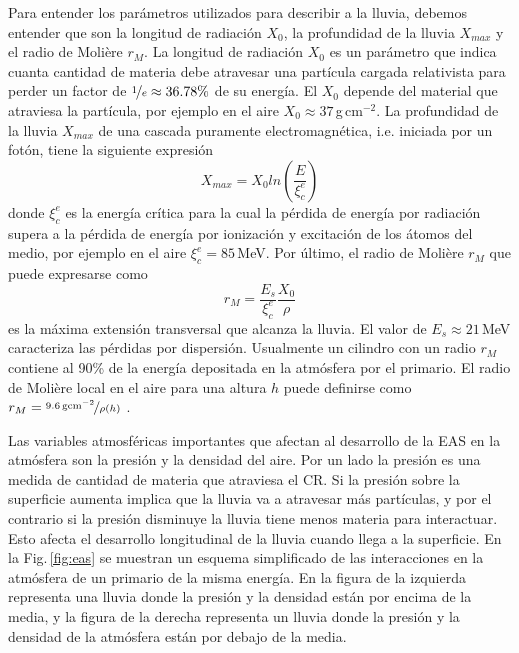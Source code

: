 
Para entender los parámetros utilizados para describir a la lluvia, debemos entender que son la longitud de radiación $X_0$, la profundidad de la lluvia $X_{max}$ y el radio de Molière $r_M$. La longitud de radiación  $X_0$ es un parámetro que indica cuanta cantidad de materia debe atravesar una partícula cargada relativista para perder un factor de $\nicefrac{1}{e}\approx 36.78\%$ de su  energía. El $X_0$ depende del material que atraviesa la partícula, por ejemplo en el aire $X_0\approx 37\,$g\,cm$^{-2}$. La profundidad de la lluvia $X_{max}$ de una cascada puramente electromagnética, i.e. iniciada por un fotón, tiene la siguiente expresión \cite{matthews2005heitler}
\begin{equation}
 	X_{max} = X_0{ln(\frac{E}{\xi^e_c})}
 \end{equation} 
donde  $\xi^e_c$ es la energía crítica para la cual la pérdida de energía por radiación supera a la pérdida de energía por ionización y excitación de los átomos del medio, por ejemplo en el aire $\xi^e_c=85\,$MeV. Por último, el radio de Molière $r_M$ que puede expresarse como 
\begin{equation}
	r_M= \frac{E_s}{\xi^e_c}\frac{X_0}{\rho}
\end{equation}
es la máxima extensión transversal que alcanza la lluvia. El valor de $E_s\approx21\,$MeV caracteriza las pérdidas por dispersión. Usualmente un cilindro con un radio $r_M$ contiene al 90\% de la energía depositada en la atmósfera por el primario. El radio de Molière local en el aire para una altura $h$ puede definirse como $r_M = \nicefrac{9.6\,\text{gcm}^{-2}}{\rho(h)}$ \cite{gora2006universal}. 

Las variables atmosféricas importantes que afectan al desarrollo de la EAS en la atmósfera son la presión y la densidad del aire. Por un lado la presión es una medida de cantidad de materia que atraviesa el CR. Si la presión sobre la superficie aumenta implica que la lluvia va a atravesar más partículas, y por el contrario si la presión disminuye la lluvia tiene menos materia para interactuar. Esto afecta el desarrollo longitudinal de la lluvia cuando llega a la superficie. En la Fig.\,\ref{fig:eas} se muestran un esquema simplificado de las interacciones en la atmósfera de un primario de la misma energía. En la figura de la izquierda representa una lluvia donde la presión y la densidad están por encima de la media, y la figura de la derecha representa un lluvia donde la presión y la densidad de la atmósfera están por debajo de la media.


